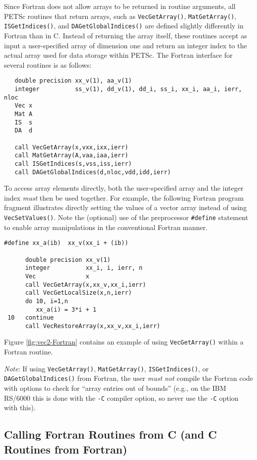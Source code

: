 Since Fortran does not allow arrays to be returned in routine
arguments, all PETSc routines that return arrays, such as 
{\tt VecGetArray()}, {\tt MatGetArray()}, 
{\tt ISGetIndices()}, and {\tt DAGetGlobalIndices()}
are defined slightly differently in Fortran than in C.  
  
 
Instead of returning the array itself, these routines
accept as input a user-specified array of dimension one and return an
integer index to the actual array used for data storage within PETSc.
The Fortran interface for several routines is as follows:
\begin{verbatim}
   double precision xx_v(1), aa_v(1)
   integer          ss_v(1), dd_v(1), dd_i, ss_i, xx_i, aa_i, ierr, nloc
   Vec x
   Mat A
   IS  s
   DA  d

   call VecGetArray(x,vxx,ixx,ierr)
   call MatGetArray(A,vaa,iaa,ierr)
   call ISGetIndices(s,vss,iss,ierr)
   call DAGetGlobalIndices(d,nloc,vdd,idd,ierr)
\end{verbatim}

To access array elements directly, both the user-specified array and
the integer index {\em must} then be used together.  
For example, the following Fortran program fragment illustrates
directly setting the values of a vector array instead of using {\tt
VecSetValues()}.  Note the (optional) use of the preprocessor 
{\tt \#define} statement to enable array manipulations in the conventional
Fortran manner.
\begin{verbatim}
#define xx_a(ib)  xx_v(xx_i + (ib))

      double precision xx_v(1)
      integer          xx_i, i, ierr, n
      Vec              x
      call VecGetArray(x,xx_v,xx_i,ierr)
      call VecGetLocalSize(x,n,ierr)
      do 10, i=1,n
         xx_a(i) = 3*i + 1
 10   continue
      call VecRestoreArray(x,xx_v,xx_i,ierr)
\end{verbatim}
Figure \ref{fig:vec2-Fortran} contains an example of using {\tt VecGetArray()}
within a Fortran routine.

{\em Note}: If using {\tt VecGetArray()}, {\tt MatGetArray()}, {\tt ISGetIndices()},
or {\tt DAGetGlobalIndices()}
from Fortran, the user {\em must not} compile the Fortran code with options 
to check for ``array entries out of bounds'' (e.g., on the IBM RS/6000 this 
is done with the {\tt -C} compiler option, so never use the {\tt -C} option with this).

\subsection{Calling Fortran Routines from C (and C Routines from Fortran)}

